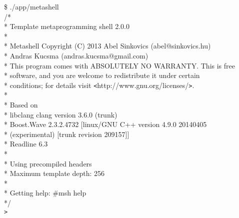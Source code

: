 
\begin{tttenv}
\noindent
{\color{color02} \$} ./app/metashell \\
{\color{color03} /* } \\
{\color{color03} * Template metaprogramming shell 2.0.0 } \\
{\color{color03} * } \\
{\color{color03} * Metashell Copyright (C) 2013 Abel Sinkovics (abel@sinkovics.hu)} \\
{\color{color03} * \hspace{14em}                Andras Kucsma  (andras.kucsma@gmail.com)} \\
{\color{color03} * This program comes with ABSOLUTELY NO WARRANTY. This is free}  \\
{\color{color03} * software, and you are welcome to redistribute it under certain} \\
{\color{color03} * conditions; for details visit \texttt{<}http://www.gnu.org/licenses/\texttt{>}. } \\
{\color{color03} * } \\
{\color{color03} * Based on } \\
{\color{color03} * \hspace{1em} libclang   clang version 3.6.0 (trunk) } \\
{\color{color03} * \hspace{1em} Boost.Wave 2.3.2.4732 [linux/GNU C++ version 4.9.0 20140405 } \\
{\color{color03} * \hspace{12em}        (experimental) [trunk revision 209157]] } \\
{\color{color03} * \hspace{1em} Readline   6.3 } \\
{\color{color03} * } \\
{\color{color03} * Using precompiled headers } \\
{\color{color03} * Maximum template depth: 256 } \\
{\color{color03} * } \\
{\color{color03} * Getting help: \#msh help } \\
{\color{color03} */} \\
\texttt{>}
\end{tttenv}

